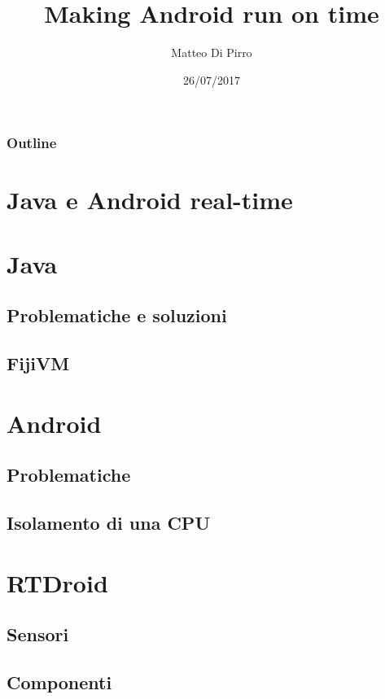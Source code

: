 \documentclass{beamer}
\title{Making Android run on time}
\subtitle{ }
\author{Matteo Di Pirro}
\date{26/07/2017}
\institute{Università degli Studi di Padova}
\begin{document}
\newcommand{\turnOffNumbers}{true} %

\begin{frame}[noframenumbering]
\titlepage
\end{frame}

\let\turnOffNumbers\empty
\begin{frame}
	\frametitle{Outline}
	\tableofcontents
\end{frame}

\section{Java e Android real-time}


\section{Java}
\subsection{Problematiche e soluzioni}


\subsection{FijiVM}




\section{Android}
\subsection{Problematiche}



\subsection{Isolamento di una CPU}




\section{RTDroid}

\subsection{Sensori}

\subsection{Componenti}

\appendix
\makethanks
\renewcommand{\turnOffNumbers}{true} %
\end{document}
